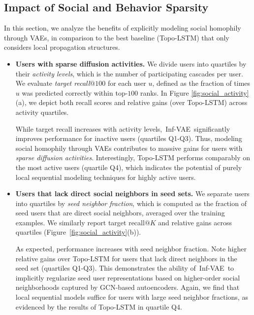 \documentclass[sigconf]{acmart}
\newcommand{\name}{Inf-VAE}
\begin{document}
\subsection{Impact of Social and Behavior Sparsity}
In this section, we analyze the benefits of explicitly modeling social homophily through VAEs, in comparison to the best baseline (Topo-LSTM) that only considers local propagation structures.
\begin{itemize}[leftmargin=*]
\item \textbf{{Users with sparse diffusion activities.}}
We divide users into quartiles by their \textit{activity levels}, which is the number of participating cascades per user. 
We evaluate \textit{target recall}$@100$ for each user $u$, defined as the fraction of times $u$ was predicted correctly within top-$100$ ranks.
In Figure \ref{fig:social_activity}(a), we depict 
both recall scores and relative gains (over Topo-LSTM) across activity quartiles.

While target recall increases with activity levels,~\name~significantly improves performance for inactive users (quartiles Q1-Q3).
Thus, modeling social homophily through VAEs contributes to massive gains for users with \textit{sparse diffusion activities}.
Interestingly, Topo-LSTM performs comparably on the most active users (quartile Q4), which indicates the potential of purely local sequential modeling techniques for highly active users.


\item  \textbf{Users that lack direct social neighbors in seed sets.}
We separate users into quartiles by \textit{seed neighbor fraction}, which is computed as the fraction of seed users that are direct social neighbors, averaged over the training examples. We similarly report target recall$@K$ and relative gains across quartiles (Figure~\ref{fig:social_activity}(b)).


As expected, performance increases with seed neighbor fraction. Note higher relative gains over Topo-LSTM for users that lack direct neighbors in the seed set (quartiles Q1-Q3). 
This demonstrates the ability of~\name~to implicitly regularize seed user representations based on higher-order social neighborhoods captured by GCN-based autoencoders.
Again, we find that local sequential models suffice for users with 
large seed neighbor fractions, as evidenced by the results of Topo-LSTM in quartile Q4.

\end{itemize}
\end{document}
